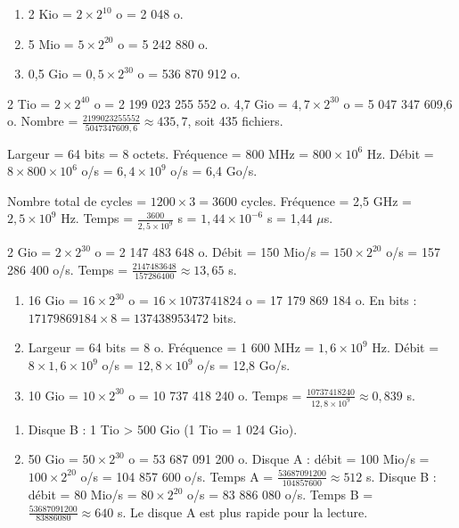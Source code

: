 \begin{enumerate}
    \item 2 Kio = $2 \times 2^{10}$ o = 2 048 o.
    \item 5 Mio = $5 \times 2^{20}$ o = 5 242 880 o.
    \item 0,5 Gio = $0,5 \times 2^{30}$ o = 536 870 912 o.
\end{enumerate}

2 Tio = $2 \times 2^{40}$ o = 2 199 023 255 552 o.
4,7 Gio = $4,7 \times 2^{30}$ o = 5 047 347 609,6 o.
Nombre = $\frac{2 199 023 255 552}{5 047 347 609,6} \approx 435,7$, soit 435 fichiers.

Largeur = 64 bits = 8 octets.
Fréquence = 800 MHz = $800 \times 10^6$ Hz.
Débit = $8 \times 800 \times 10^6$ o/s = $6,4 \times 10^9$ o/s = 6,4 Go/s.

Nombre total de cycles = $1 200 \times 3 = 3 600$ cycles.
Fréquence = 2,5 GHz = $2,5 \times 10^9$ Hz.
Temps = $\frac{3 600}{2,5 \times 10^9}$ s = $1,44 \times 10^{-6}$ s = 1,44 $\mu$s.

2 Gio = $2 \times 2^{30}$ o = 2 147 483 648 o.
Débit = 150 Mio/s = $150 \times 2^{20}$ o/s = 157 286 400 o/s.
Temps = $\frac{2 147 483 648}{157 286 400} \approx 13,65$ s.

\begin{enumerate}
    \item 16 Gio = $16 \times 2^{30}$ o = $16 \times 1 073 741 824$ o = 17 179 869 184 o.
          En bits : $17 179 869 184 \times 8 = 137 438 953 472$ bits.
    \item Largeur = 64 bits = 8 o. Fréquence = 1 600 MHz = $1,6 \times 10^9$ Hz.
          Débit = $8 \times 1,6 \times 10^9$ o/s = $12,8 \times 10^9$ o/s = 12,8 Go/s.
    \item 10 Gio = $10 \times 2^{30}$ o = 10 737 418 240 o.
          Temps = $\frac{10 737 418 240}{12,8 \times 10^9} \approx 0,839$ s.
\end{enumerate}

\begin{enumerate}
    \item Disque B : 1 Tio > 500 Gio (1 Tio = 1 024 Gio).
    \item 50 Gio = $50 \times 2^{30}$ o = 53 687 091 200 o.
          Disque A : débit = 100 Mio/s = $100 \times 2^{20}$ o/s = 104 857 600 o/s.
          Temps A = $\frac{53 687 091 200}{104 857 600} \approx 512$ s.
          Disque B : débit = 80 Mio/s = $80 \times 2^{20}$ o/s = 83 886 080 o/s.
          Temps B = $\frac{53 687 091 200}{83 886 080} \approx 640$ s.
          Le disque A est plus rapide pour la lecture.
\end{enumerate}

